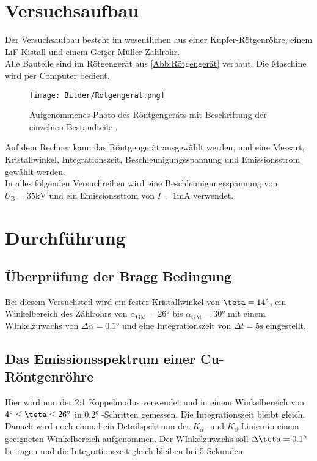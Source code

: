 \section{Versuchsaufbau}
\label{sec:Versuchsaufbau}

Der Versuchsaufbau besteht im wesentlichen aus einer Kupfer-Rötgenröhre,
einem LiF-Kistall und einem Geiger-Müller-Zählrohr.\\
Alle Bauteile sind im Rötgengerät aus \autoref{Abb:Rötgengerät} verbaut.
Die Maschine wird per Computer bedient.

\begin{figure}
    \centering
    \texttt{[image: Bilder/Rötgengerät.png]}
    \caption{Aufgenommenes Photo des Röntgengeräts mit Beschriftung der einzelnen Bestandteile \cite{sample}.}
    \label{Abb:Rötgengerät}
\end{figure}

Auf dem Rechner kann das Röntgengerät ausgewählt werden, und eine Messart,
Kristallwinkel, Integrationszeit, Beschleunigungsspannung und Emissionsstrom 
gewählt werden.\\
In alles folgenden Versuchreihen wird eine Beschleunigungsspannung von 
$U_{\mathrm{B}} = 35 \si{\kilo\volt}$ und ein Emissionsstrom von $I = 1 \si{\milli\ampere}$
verwendet.\\

\section{Durchführung}
\label{sec:Durchführung}

\subsection{Überprüfung der Bragg Bedingung}

Bei diesem Versuchsteil wird ein fester Kristallwinkel
von $\teta = 14 \si{\degree}$, ein Winkelbereich des Zählrohrs
von $\alpha_{\mathrm{GM}} = 26 \si{\degree}$ bis $\alpha_{\mathrm{GM}} = 30 \si{\degree}$
mit einem WInkelzuwachs von $\Delta \alpha = 0.1 \si{\degree}$ und eine 
Integrationszeit von $\Delta t = 5 \si{\second}$ eingestellt.\\

\subsection{Das Emissionsspektrum einer Cu-Röntgenröhre}

Hier wird nun der 2:1 Koppelmodus verwendet und in einem Winkelbereich
von $ 4 \si{\degree} \leq \teta \leq 26 \si{\degree}$ in $0.2 \si{\degree}$
-Schritten gemessen. Die Integrationszeit bleibt gleich.\\
Danach wird noch einmal ein Detailspektrum der $K_{\alpha}$- und $K_{\beta}$-Linien
in einem geeigneten Winkelbereich aufgenommen. Der WInkelzuwachs soll $\Delta \teta = 0.1 \si{\degree}$
betragen und die Integrationszeit gleich bleiben bei 5 Sekunden.\\

